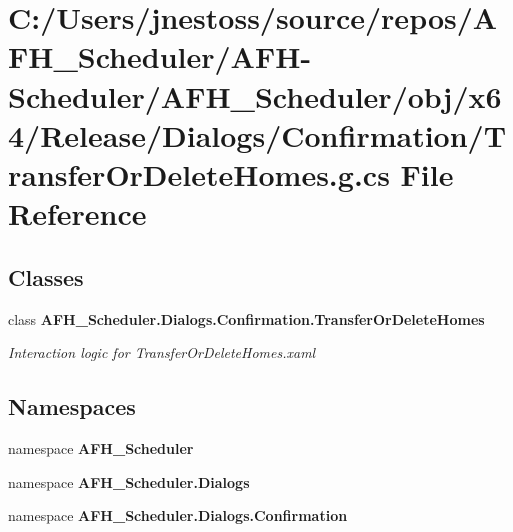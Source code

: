 \section{C\+:/\+Users/jnestoss/source/repos/\+A\+F\+H\+\_\+\+Scheduler/\+A\+F\+H-\/\+Scheduler/\+A\+F\+H\+\_\+\+Scheduler/obj/x64/\+Release/\+Dialogs/\+Confirmation/\+Transfer\+Or\+Delete\+Homes.g.\+cs File Reference}
\label{x64_2_release_2_dialogs_2_confirmation_2_transfer_or_delete_homes_8g_8cs}
\subsection*{Classes}
\begin{DoxyCompactItemize}
\item 
class \textbf{ A\+F\+H\+\_\+\+Scheduler.\+Dialogs.\+Confirmation.\+Transfer\+Or\+Delete\+Homes}
\begin{DoxyCompactList}\small\item\em Interaction logic for Transfer\+Or\+Delete\+Homes.\+xaml \end{DoxyCompactList}\end{DoxyCompactItemize}
\subsection*{Namespaces}
\begin{DoxyCompactItemize}
\item 
namespace \textbf{ A\+F\+H\+\_\+\+Scheduler}
\item 
namespace \textbf{ A\+F\+H\+\_\+\+Scheduler.\+Dialogs}
\item 
namespace \textbf{ A\+F\+H\+\_\+\+Scheduler.\+Dialogs.\+Confirmation}
\end{DoxyCompactItemize}
